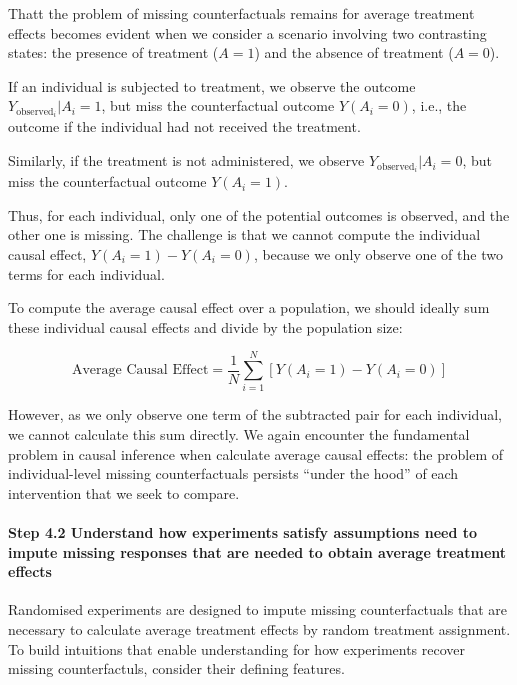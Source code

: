 \documentclass[
  singlecolumn]{article}
\let\oldparagraph\paragraph
\renewcommand{\paragraph}[1]{\oldparagraph{#1}\mbox{}}
\begin{document}
Thatt the problem of missing counterfactuals remains for average
treatment effects becomes evident when we consider a scenario involving
two contrasting states: the presence of treatment (\(A = 1\)) and the
absence of treatment (\(A = 0\)).

If an individual is subjected to treatment, we observe the outcome
\(Y_{\text{observed}_i}|A_i = 1\), but miss the counterfactual outcome
\(Y(A_i = 0)\), i.e., the outcome if the individual had not received the
treatment.

Similarly, if the treatment is not administered, we observe
\(Y_{\text{observed}_i}|A_i = 0\), but miss the counterfactual outcome
\(Y(A_i = 1)\).

Thus, for each individual, only one of the potential outcomes is
observed, and the other one is missing. The challenge is that we cannot
compute the individual causal effect, \(Y(A_i = 1) - Y(A_i = 0)\),
because we only observe one of the two terms for each individual.

To compute the average causal effect over a population, we should
ideally sum these individual causal effects and divide by the population
size:

\[
\text{Average Causal Effect} = \frac{1}{N}\sum_{i=1}^{N} [Y(A_i = 1) - Y(A_i = 0)]
\]

However, as we only observe one term of the subtracted pair for each
individual, we cannot calculate this sum directly. We again encounter
the fundamental problem in causal inference when calculate average
causal effects: the problem of individual-level missing counterfactuals
persists ``under the hood'' of each intervention that we seek to
compare.

\hypertarget{step-4.2-understand-how-experiments-satisfy-assumptions-need-to-impute-missing-responses-that-are-needed-to-obtain-average-treatment-effects}{%
\paragraph{Step 4.2 Understand how experiments satisfy assumptions need
to impute missing responses that are needed to obtain average treatment
effects}\label{step-4.2-understand-how-experiments-satisfy-assumptions-need-to-impute-missing-responses-that-are-needed-to-obtain-average-treatment-effects}}

Randomised experiments are designed to impute missing counterfactuals
that are necessary to calculate average treatment effects by random
treatment assignment. To build intuitions that enable understanding for
how experiments recover missing counterfactuls, consider their defining
features.
\end{document}
